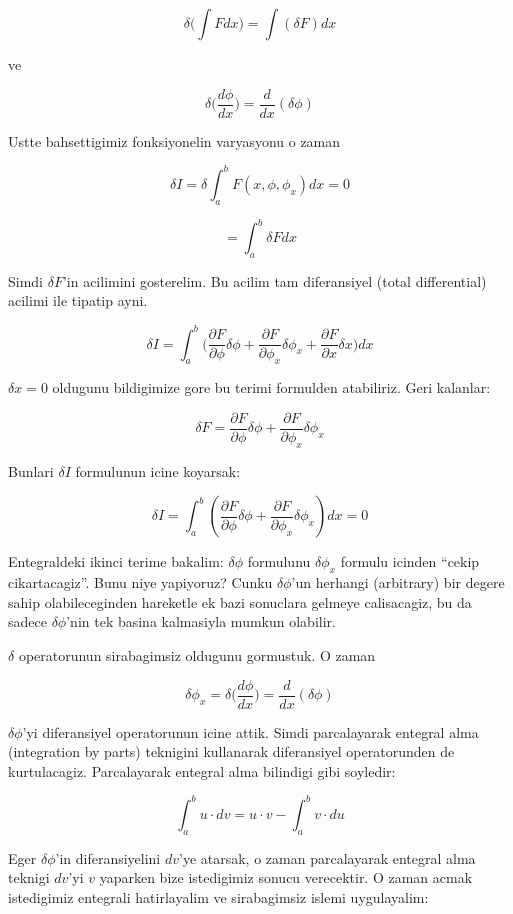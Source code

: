 \documentclass[12pt,fleqn]{article}\usepackage{../common}
\begin{document}
\[ \delta \bigg( \int F dx \bigg) = \int (\delta F)dx \]

ve

\[ \delta \bigg( \frac{d\phi}{dx} \bigg) = \frac{d}{dx}(\delta \phi) \]

Ustte bahsettigimiz fonksiyonelin varyasyonu o zaman

\[ \delta I = \delta \int_a^b F(x,\phi,\phi_x)dx = 0 \]

\[ = \int_a^b \delta F dx  \]

Simdi $\delta F$'in acilimini gosterelim. Bu acilim tam diferansiyel (total
differential) acilimi ile tipatip ayni. 

\[ \delta I = \int_{a}^{b} \bigg(
\frac{\partial F}{\partial \phi}\delta\phi +
\frac{\partial F}{\partial \phi_x}\delta\phi_x +
\frac{\partial F}{\partial x}\delta x 
\bigg) dx
 \]

 $\delta x = 0$ oldugunu bildigimize gore bu terimi formulden
 atabiliriz. Geri kalanlar:

\[ 
\delta F = 
\frac{\partial F}{\partial \phi}\delta\phi +
\frac{\partial F}{\partial \phi_x}\delta\phi_x  
\]

Bunlari $\delta I$ formulunun icine koyarsak:

\[ 
\delta I  = \int_{a}^{b} (
\frac{\partial F}{\partial \phi}\delta\phi +
\frac{\partial F}{\partial \phi_x}\delta\phi_x 
) dx = 0
 \]

Entegraldeki ikinci terime bakalim: $\delta \phi$ formulunu $\delta
\phi_x$ formulu icinden ``cekip cikartacagiz''. Bunu niye yapiyoruz?
Cunku $\delta \phi$'un herhangi (arbitrary) bir degere sahip
olabileceginden hareketle ek bazi sonuclara gelmeye calisacagiz, bu
da sadece $\delta \phi$'nin tek basina kalmasiyla mumkun olabilir.

$\delta$ operatorunun sirabagimsiz oldugunu gormustuk. O zaman 

\[ 
\delta \phi_x = \delta \bigg( \frac{d\phi}{dx} \bigg) =
\frac{d}{dx}(\delta \phi)
 \]

$\delta \phi$'yi diferansiyel operatorunun icine attik. Simdi parcalayarak
entegral alma (integration by parts) teknigini kullanarak diferansiyel
operatorunden de kurtulacagiz. Parcalayarak entegral alma bilindigi gibi 
soyledir:

\[ \int_a^b u \cdot dv = u \cdot v - \int_a^b v \cdot du \]

Eger $\delta \phi$'in diferansiyelini $dv$'ye atarsak, o zaman parcalayarak
entegral alma teknigi $dv$'yi $v$ yaparken bize istedigimiz sonucu verecektir. O
zaman acmak istedigimiz entegrali hatirlayalim ve sirabagimsiz islemi uygulayalim:
\end{document}

